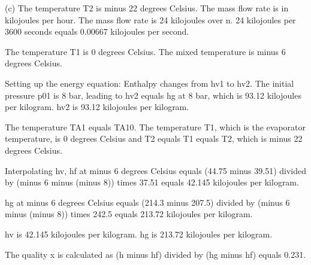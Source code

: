 (c) 
The temperature T2 is minus 22 degrees Celsius.
The mass flow rate is in kilojoules per hour.
The mass flow rate is 24 kilojoules over n.
24 kilojoules per 3600 seconds equals 0.00667 kilojoules per second.

The temperature T1 is 0 degrees Celsius.
The mixed temperature is minus 6 degrees Celsius.

Setting up the energy equation:
Enthalpy changes from hv1 to hv2.
The initial pressure p01 is 8 bar, leading to hv2 equals hg at 8 bar, which is 93.12 kilojoules per kilogram.
hv2 is 93.12 kilojoules per kilogram.

The temperature TA1 equals TA10.
The temperature T1, which is the evaporator temperature, is 0 degrees Celsius and T2 equals T1 equals T2, which is minus 22 degrees Celsius.

Interpolating hv, hf at minus 6 degrees Celsius equals (44.75 minus 39.51) divided by (minus 6 minus (minus 8)) times 37.51 equals 42.145 kilojoules per kilogram.

hg at minus 6 degrees Celsius equals (214.3 minus 207.5) divided by (minus 6 minus (minus 8)) times 242.5 equals 213.72 kilojoules per kilogram.

hv is 42.145 kilojoules per kilogram.
hg is 213.72 kilojoules per kilogram.

The quality x is calculated as (h minus hf) divided by (hg minus hf) equals 0.231.